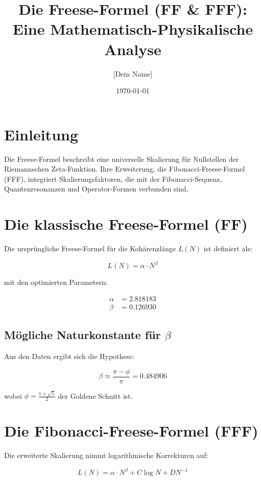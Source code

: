 \documentclass[a4paper,12pt]{article}
\title{Die Freese-Formel (FF \& FFF): Eine Mathematisch-Physikalische Analyse}
\author{[Dein Name]}
\date{\today}
\begin{document}
\maketitle

\section{Einleitung}
Die Freese-Formel beschreibt eine universelle Skalierung für Nullstellen der Riemannschen Zeta-Funktion. Ihre Erweiterung, die Fibonacci-Freese-Formel (FFF), integriert Skalierungsfaktoren, die mit der Fibonacci-Sequenz, Quantenresonanzen und Operator-Formen verbunden sind.

\section{Die klassische Freese-Formel (FF)}
Die ursprüngliche Freese-Formel für die Kohärenzlänge \( L(N) \) ist definiert als:

\begin{equation}
L(N) = \alpha \cdot N^{\beta}
\end{equation}

mit den optimierten Parametern:

\begin{align*}
\alpha &= 2.818183 \\
\beta &= 0.126930
\end{align*}

\subsection{Mögliche Naturkonstante für \( \beta \)}
Aus den Daten ergibt sich die Hypothese:

\begin{equation}
\beta \approx \frac{\pi - \phi}{\pi} = 0.484906
\end{equation}

wobei \( \phi = \frac{1+\sqrt{5}}{2} \) der Goldene Schnitt ist.

\section{Die Fibonacci-Freese-Formel (FFF)}
Die erweiterte Skalierung nimmt logarithmische Korrekturen auf:

\begin{equation}
L(N) = \alpha \cdot N^{\beta} + C \log N + D N^{-1}
\end{equation}
\end{document}
